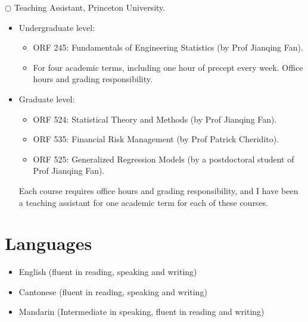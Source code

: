 \documentclass[overlapped,line,letterpaper]{res}
\begin{document}
\begin{resume}
$\bigcirc$ {Teaching Assistant, Princeton University.}

\begin{itemize}
\item[$\bullet$] Undergraduate level:
\begin{itemize}
\item ORF 245: Fundamentals of Engineering Statistics (by Prof Jianqing Fan).
\item For four academic terms, including one hour of precept every week. Office hours and grading responsibility.
\end{itemize}
\item[$\bullet$] Graduate level:
\begin{itemize}
\item ORF 524: Statistical Theory and Methods (by Prof Jianqing
Fan).

\item ORF 535: Financial Risk Management (by Prof Patrick
Cheridito).

\item ORF 525: Generalized Regression Models (by a postdoctoral student of Prof Jianqing Fan).
\end{itemize}
Each course requires office hours and grading responsibility, and
I have been a teaching assistant for one academic term for each of
these courses.
\end{itemize}



\section{Languages}
\begin{itemize}
        \item[$\bullet$] English (fluent in reading, speaking and writing)
        \item[$\bullet$] Cantonese (fluent in reading, speaking and writing)
        \item[$\bullet$] Mandarin (Intermediate in speaking, fluent in reading and writing)
\end{itemize}


\end{resume}
\end{document}

